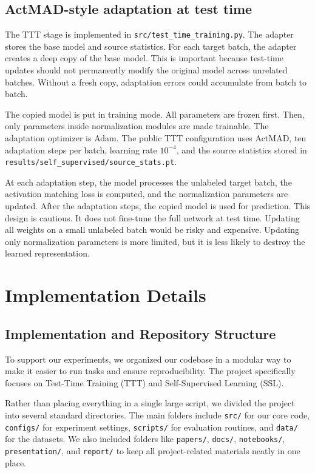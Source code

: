 \documentclass[a4paper,11pt]{article}
\begin{document}
\subsection{ActMAD-style adaptation at test time}

The TTT stage is implemented in \texttt{src/test\_time\_training.py}. The adapter stores the base model and source statistics. For each target batch, the adapter creates a deep copy of the base model. This is important because test-time updates should not permanently modify the original model across unrelated batches. Without a fresh copy, adaptation errors could accumulate from batch to batch.

The copied model is put in training mode. All parameters are frozen first. Then, only parameters inside normalization modules are made trainable. The adaptation optimizer is Adam. The public TTT configuration uses ActMAD, ten adaptation steps per batch, learning rate \(10^{-4}\), and the source statistics stored in \texttt{results/self\_supervised/source\_stats.pt}.

At each adaptation step, the model processes the unlabeled target batch, the activation matching loss is computed, and the normalization parameters are updated. After the adaptation steps, the copied model is used for prediction. This design is cautious. It does not fine-tune the full network at test time. Updating all weights on a small unlabeled batch would be risky and expensive. Updating only normalization parameters is more limited, but it is less likely to destroy the learned representation.

\section{Implementation Details}

\subsection{Implementation and Repository Structure}

To support our experiments, we organized our codebase in a modular way to make it easier to run tasks and ensure reproducibility. The project specifically focuses on Test-Time Training (TTT) and Self-Supervised Learning (SSL).

Rather than placing everything in a single large script, we divided the project into several standard directories. The main folders include \texttt{src/} for our core code, \texttt{configs/} for experiment settings, \texttt{scripts/} for evaluation routines, and \texttt{data/} for the datasets. We also included folders like \texttt{papers/}, \texttt{docs/}, \texttt{notebooks/}, \texttt{presentation/}, and \texttt{report/} to keep all project-related materials neatly in one place.
\end{document}
